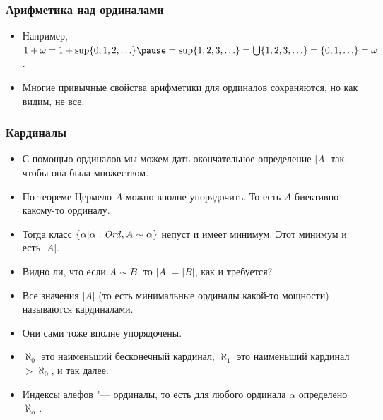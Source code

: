 \documentclass[10pt]{beamer}
\begin{document}
\begin{frame}
    \frametitle{Арифметика над ординалами}
    \begin{itemize}
        \item Например, $1 + \omega = 1 + \sup \{0, 1, 2, \ldots\} \pause = \sup \{1, 2, 3, \ldots\} = \bigcup \{1, 2, 3, \ldots\} = \{0, 1, \ldots\} = \omega$.
        \item Многие привычные свойства арифметики для ординалов сохраняются, но как видим, не все.
    \end{itemize}
\end{frame}

\begin{frame}
    \frametitle{Кардиналы}
    \begin{itemize}
        \item С помощью ординалов мы можем дать окончательное определение $|A|$ так, чтобы она была множеством.
        \pause
        \item По теореме Цермело $A$ можно вполне упорядочить. То есть $A$ биективно какому-то ординалу.
        \item Тогда класс $\{\alpha | \alpha:\mathit{Ord}, A \sim \alpha\}$ непуст и имеет \pause минимум. Этот минимум и есть $|A|$.
        \item Видно ли, что если $A \sim B$, то $|A| = |B|$, как и требуется?
        \item Все значения $|A|$ (то есть минимальные ординалы какой-то мощности) называются кардиналами.
        \pause
        \item Они сами тоже вполне упорядочены.
        \item $\aleph_0$ это наименьший бесконечный кардинал, $\aleph_1$ это наименьший кардинал $>\aleph_0$, и так далее.
        \item Индексы алефов "--- ординалы, то есть для любого ординала $\alpha$ определено $\aleph_\alpha$.
    \end{itemize}
\end{frame}

\newlength{\geqwidth}
\settowidth{\geqwidth}{$\geq$}
\end{document}
